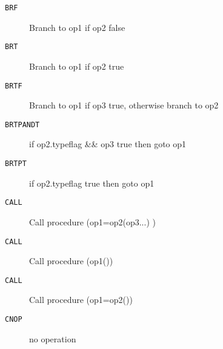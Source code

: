 
\begin{description}
\item[\texttt{BRF        }]  Branch to op1 if op2 false\\
\end{description}

\begin{description}
\item[\texttt{BRT        }]  Branch to op1 if op2 true\\
\end{description}

\begin{description}
\item[\texttt{BRTF       }]  Branch to op1 if op3 true, otherwise branch to op2\\
\end{description}

\begin{description}
\item[\texttt{BRTPANDT   }]  if op2.typeflag \&\& op3 true then goto op1\\
\end{description}

\begin{description}
\item[\texttt{BRTPT      }]  if op2.typeflag true then goto op1\\
\end{description}

\begin{description}
\item[\texttt{CALL       }]  Call procedure (op1=op2(op3...) )\\
\end{description}

\begin{description}
\item[\texttt{CALL       }]  Call procedure (op1())\\
\end{description}

\begin{description}
\item[\texttt{CALL       }]  Call procedure (op1=op2())\\
\end{description}

\begin{description}
\item[\texttt{CNOP       }]  no operation\\
\end{description}

